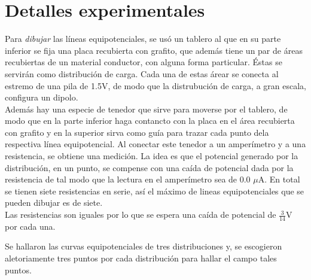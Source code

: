 \documentclass[10pt,twocolumn]{article}
\begin{document}
\section{Detalles experimentales}
Para \emph{dibujar} las líneas equipotenciales, se usó un tablero al que en su parte inferior se fija una placa recubierta con grafito, que además tiene un par de áreas recubiertas de un  material conductor, con alguna forma particular. Éstas se servirán como distribución de carga. Cada una de estas árear se conecta al estremo de una pila de 1.5V, de modo que la distrubución de carga, a gran escala, configura un dipolo. \\Además hay una especie de tenedor que sirve para moverse por el tablero, de modo que en la parte inferior haga contancto con la placa en el área recubierta con grafito y en la superior sirva como guía para trazar cada punto dela respectiva línea equipotencial. Al conectar este tenedor a un amperímetro y a una resistencia, se obtiene una medición. La idea es que el potencial generado por la distribución, en un punto, se compense con una caída de potencial dada por la resistencia de tal modo que la lectura en el amperímetro sea de 0.0 $\mu{}$A. En total se tienen siete  resistencias en serie, así el máximo de lineas equipotenciales que se pueden dibujar es de siete. \\
Las resistencias son iguales por lo que se espera una caída de potencial de $\frac{3}{14}$V por cada una. 

Se hallaron las curvas equipotenciales de tres distribuciones y, se escogieron aletoriamente tres puntos por cada distribución para hallar el campo tales puntos.
\end{document}

